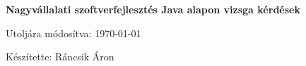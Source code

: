 \begin{titlepage}
	\begin{center}
		{\LARGE\textbf{Nagyvállalati szoftverfejlesztés Java alapon vizsga kérdések}}
	\end{center}
	\vfill
	\begin{center}
		{\large Utoljára módosítva: \today}
		\vspace{0.5cm}
		
		{Készítette: Ráncsik Áron}
	\end{center}
\end{titlepage}